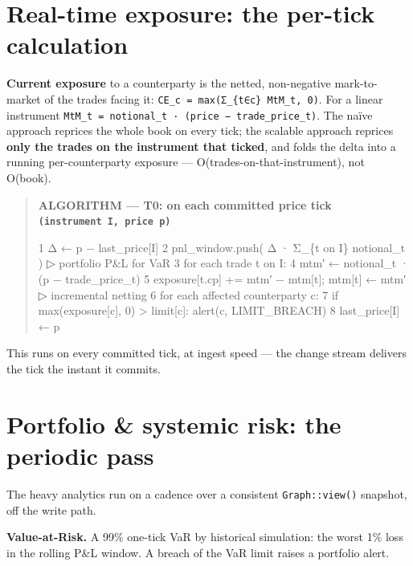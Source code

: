 \documentclass[
  11pt,
  openany]{book}
\newenvironment{Shaded}{}{}
\newcommand{\NormalTok}[1]{#1}
\begin{document}
\section{Real-time exposure: the per-tick
calculation}\label{real-time-exposure-the-per-tick-calculation}

\textbf{Current exposure} to a counterparty is the netted, non-negative
mark-to-market of the trades facing it:
\texttt{CE\_c\ =\ max(Σ\_\{t∈c\}\ MtM\_t,\ 0)}. For a linear instrument
\texttt{MtM\_t\ =\ notional\_t\ ·\ (price\ −\ trade\_price\_t)}. The
naïve approach reprices the whole book on every tick; the scalable
approach reprices \textbf{only the trades on the instrument that
ticked}, and folds the delta into a running per-counterparty exposure
--- O(trades-on-that-instrument), not O(book).

\begin{quote}
\textbf{ALGORITHM --- T0: on each committed price tick
\texttt{(instrument\ I,\ price\ p)}}

\begin{Shaded}
\begin{Highlighting}[]
\NormalTok{1  Δ ← p − last\_price[I]}
\NormalTok{2  pnl\_window.push( Δ · Σ\_\{t on I\} notional\_t )        ▷ portfolio P\&L for VaR}
\NormalTok{3  for each trade t on I:}
\NormalTok{4      mtm′ ← notional\_t · (p − trade\_price\_t)}
\NormalTok{5      exposure[t.cp] += mtm′ − mtm[t];  mtm[t] ← mtm′  ▷ incremental netting}
\NormalTok{6  for each affected counterparty c:}
\NormalTok{7      if max(exposure[c], 0) \textgreater{} limit[c]:  alert(c, LIMIT\_BREACH)}
\NormalTok{8  last\_price[I] ← p}
\end{Highlighting}
\end{Shaded}
\end{quote}

This runs on every committed tick, at ingest speed --- the change stream
delivers the tick the instant it commits.

\section{Portfolio \& systemic risk: the periodic
pass}\label{portfolio-systemic-risk-the-periodic-pass}

The heavy analytics run on a cadence over a consistent
\texttt{Graph::view()} snapshot, off the write path.

\textbf{Value-at-Risk.} A 99\% one-tick VaR by historical simulation:
the worst 1\% loss in the rolling P\&L window. A breach of the VaR limit
raises a portfolio alert.
\end{document}
